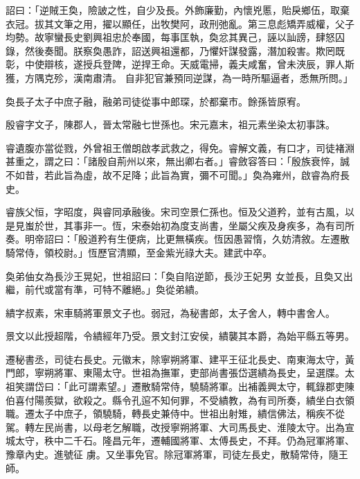 \begin{pinyinscope}
 詔曰：「逆賊王奐，險詖之性，自少及長。外飾廉勤，內懷兇慝，貽戾鄉伍，取棄衣冠。拔其文筆之用，擢以顯任，出牧樊阿，政刑弛亂。第三息彪矯弄威權，父子均勢。故寧蠻長史劉興祖忠於奉國，每事匡執，奐忿其異己，誣以訕謗，肆怒囚錄，然後奏聞。朕察奐愚詐，詔送興祖還都，乃懼奸謀發露，潛加殺害。欺罔既彰，中使辯核，遂授兵登陴，逆捍王命。天威電掃，義夫咸奮，曾未浹辰，罪人斯獲，方隅克殄，漢南肅清。
 自非犯官兼預同逆謀，為一時所驅逼者，悉無所問。」



 奐長子太子中庶子融，融弟司徒從事中郎琛，於都棄市。餘孫皆原宥。



 殷睿字文子，陳郡人，晉太常融七世孫也。宋元嘉末，祖元素坐染太初事誅。



 睿遺腹亦當從戮，外曾祖王僧朗啟孝武救之，得免。睿解文義，有口才，司徒褚淵甚重之，謂之曰：「諸殷自荊州以來，無出卿右者。」睿斂容答曰：「殷族衰悴，誠不如昔，若此旨為虛，故不足降；此旨為實，彌不可聞。」奐為雍州，啟睿為府長史。



 睿族父恒，字昭度，與睿同承融後。宋司空景仁孫也。恒及父道矜，並有古風，以是見蚩於世，其事非一。恆，宋泰始初為度支尚書，坐屬父疾及身疾多，為有司所奏。明帝詔曰：「殷道矜有生便病，比更無橫疾。恆因愚習惰，久妨清敘。左遷散騎常侍，領校尉。」恆歷官清顯，至金紫光祿大夫。建武中卒。



 奐弟伷女為長沙王晃妃，世祖詔曰：「奐自陷逆節，長沙王妃男
 女並長，且奐又出繼，前代或當有準，可特不離絕。」奐從弟繢。



 繢字叔素，宋車騎將軍景文子也。弱冠，為秘書郎，太子舍人，轉中書舍人。



 景文以此授超階，令繢經年乃受。景文封江安侯，繢襲其本爵，為始平縣五等男。



 遷秘書丞，司徒右長史。元徽末，除寧朔將軍、建平王征北長史、南東海太守，黃門郎，寧朔將軍、東陽太守。世祖為撫軍，吏部尚書張岱選繢為長史，呈選牒。太祖笑謂岱曰：「此可謂素望。」遷散騎常侍，驍騎將軍。出補義興太守，輒錄郡吏陳伯喜付陽羨獄，欲殺之。縣令孔逭不知何罪，不受繢教，為有司所奏，繢坐白衣領職。遷太子中庶子，領驍騎，轉長史兼侍中。世祖出射雉，繢信佛法，稱疾不從駕。轉左民尚書，以母老乞解職，改授寧朔將軍、大司馬長史、淮陵太守。出為宣城太守，秩中二千石。隆昌元年，遷輔國將軍、太傅長史，不拜。仍為冠軍將軍、豫章內史。進號征
 虜。又坐事免官。除冠軍將軍，司徒左長史，散騎常侍，隨王師。




\end{pinyinscope}
